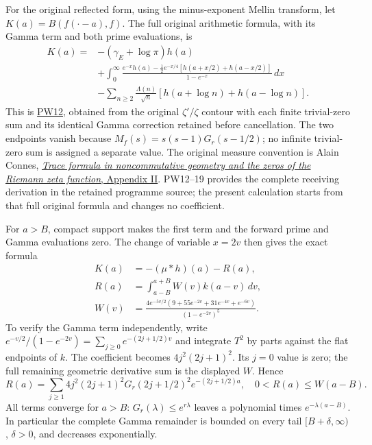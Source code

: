 For the original reflected form, using the minus-exponent Mellin
transform, let \(K(a)=B(f(\cdot-a),f)\). The full original arithmetic
formula, with its Gamma term and both prime evaluations, is
\[
\begin{split}
 K(a)={}&-(\gamma_E+\log\pi)h(a)\\
 &+\int_0^\infty
 \frac{e^{-x}h(a)-\tfrac12e^{-x/4}[h(a+x/2)+h(a-x/2)]}{1-e^{-x}}\,dx\\
 &-\sum_{n\ge2}\frac{\Lambda(n)}{\sqrt n}
                 [h(a+\log n)+h(a-\log n)].
\end{split}\tag{GC5}
\]
This is \href{https://github.com/KokunoYumeto/zeta-function-research-reader/blob/84edd11df011c3e161a57dad9f083276a3c0bb95/workbenches/splitzero-tandem/branches/tau-zero-prime-positivity/PRIMITIVE_PRIME_WINDOW_DERIVATION.tex}{PW12}, obtained from the original \(\zeta'/\zeta\) contour
with each finite trivial-zero sum and its identical Gamma correction
retained before cancellation. The two endpoints vanish because
\(M_f(s)=s(s-1)G_r(s-1/2)\); no infinite trivial-zero sum is assigned
a separate value. The original measure convention is Alain Connes,
\href{https://arxiv.org/abs/math/9811068v1}{\emph{Trace formula in
noncommutative geometry and the zeros of the Riemann zeta function},
Appendix II}. PW12--19 provides the complete receiving derivation in
the retained programme source; the present calculation starts from
that full original formula and changes no coefficient.

For \(a>B\), compact support makes the first term and the forward
prime and Gamma evaluations zero. The change of variable \(x=2v\)
then gives the exact formula
\[
\begin{split}
 K(a)&=-(\mu*h)(a)-R(a),\\
 R(a)&=\int_{a-B}^{a+B}W(v)k(a-v)\,dv,\\
 W(v)&=\frac{4e^{-5v/2}(9+55e^{-2v}+31e^{-4v}+e^{-6v})}
                         {(1-e^{-2v})^5}.
\end{split}\tag{GC6}
\]
To verify the Gamma term independently, write
\(e^{-v/2}/(1-e^{-2v})=\sum_{j\ge0}e^{-(2j+1/2)v}\)
and integrate \(T^2\) by parts against the flat endpoints of \(k\).
The coefficient becomes \(4j^2(2j+1)^2\). Its \(j=0\) value is
zero; the full remaining geometric derivative sum is the displayed
\(W\). Hence
\[
 R(a)=\sum_{j\ge1}4j^2(2j+1)^2G_r(2j+1/2)^2
                     e^{-(2j+1/2)a},\quad
 0<R(a)\le W(a-B).\tag{GC7}
\]
All terms converge for \(a>B\): \(G_r(\lambda)\le e^{r\lambda}\)
leaves a polynomial times \(e^{-\lambda(a-B)}\). In particular
the complete Gamma remainder is bounded on every tail
\([B+\delta,\infty)\), \(\delta>0\), and decreases exponentially.

